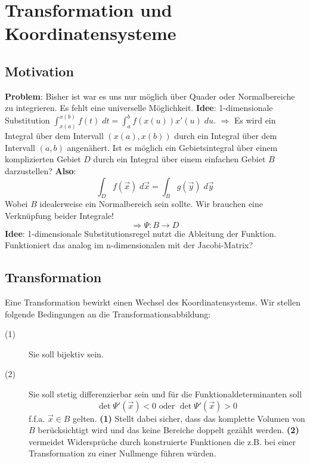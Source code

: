 \section{Transformation und Koordinatensysteme}
	\subsection{Motivation}
	\textbf{Problem}:	Bisher ist war es uns nur möglich über Quader oder Normalbereiche zu integrieren. Es fehlt eine universelle Möglichkeit. \newline
	\textbf{Idee}: 1-dimensionale Substitution $\int_{x(a)}^{x(b)} f(t) \;dt = \int_a^b f(x(u))x'(u)\;du$.
	$\Rightarrow$ Es wird ein Integral über dem Intervall $(x(a), x(b))$ durch ein Integral über dem Intervall $(a,b)$ angenähert. \newline
	Ist es möglich ein Gebietsintegral über einem komplizierten Gebiet $D$ durch ein Integral über einem einfachen Gebiet $B$ darzustellen?\newline
	\textbf{Also}:
	\begin{equation}
		\int_D f(\vec{x})\;d\vec{x} = \int_B g(\vec{y})\;d\vec{y}
	\end{equation}
	Wobei $B$ idealerweise ein Normalbereich sein sollte. Wir brauchen eine Verknüpfung beider Integrale!
	\begin{equation*}
		\Rightarrow \Psi: B \to D
	\end{equation*}
	\textbf{Idee}: 1-dimensionale Substitutionsregel nutzt die Ableitung der Funktion. Funktioniert das analog im n-dimensionalen mit der Jacobi-Matrix?
	
	 \subsection{Transformation}
	 Eine Transformation bewirkt einen Wechsel des Koordinatensystems. Wir stellen folgende Bedingungen an die Transformationsabbildung:
	 \begin{description}
	 	\item[(1) ] Sie soll bijektiv sein. \\
	 	\item[(2) ] Sie soll stetig differenzierbar sein und für die Funktionaldeterminanten soll
	 	\begin{equation}
	 		\det \Psi'(\vec{x}) < 0 \text{ oder } \det \Psi'(\vec{x}) > 0
	 	\end{equation}
	 	f.f.a. $\vec{x} \in B$ gelten.
	 	\textbf{(1)} Stellt dabei sicher, dass das komplette Volumen von $B$ berücksichtigt wird und das keine Bereiche doppelt gezählt werden. \textbf{(2)} vermeidet Widersprüche durch konstruierte Funktionen die z.B. bei einer Transformation zu einer Nullmenge führen würden.
	 \end{description}
	 
